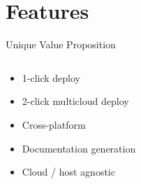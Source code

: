 \documentclass[aspectratio=169]{beamer}
\begin{document}
\section{Features}

\begin{frame}{Unique Value Proposition}
        \begin{columns}
            \begin{column}{0.5\textwidth}
        
  \begin{tvWindow}[UVP]
    \begin{itemize}[<+->]
      \item 1-click deploy
      \item 2-click multicloud deploy
      \item Cross-platform
      \item Documentation generation
      \item Cloud / host agnostic
    \end{itemize}
  \end{tvWindow}
\end{column}
\end{columns}
\end{frame}


    
\end{document}
